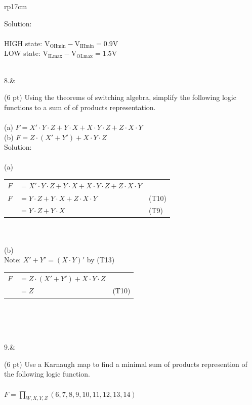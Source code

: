 \documentclass{article}
\begin{document}
\begin{longtable}[l]{rp{17cm}}
\begin{minipage}[t]{\linewidth}
Solution: \\ \\
HIGH state: $\textrm{V}_{\textrm{OHmin}} - \textrm{V}_{\textrm{IHmin}} = 0.9 \textrm{V}$\\
LOW state: $\textrm{V}_{\textrm{ILmax}} - \textrm{V}_{\textrm{OLmax}} = 1.5 \textrm{V}$\\
\end{minipage}\\
\medskip
8.&\begin{minipage}[t]{\linewidth}(6 pt) Using the theorems of switching algebra, simplify the following logic functions to a sum of of products representation.\\ \\
(a) $F=X' \cdot Y \cdot Z + Y \cdot X + X \cdot Y \cdot Z + Z \cdot X \cdot Y$ \\
(b) $F=Z \cdot (X' + Y') + X \cdot Y \cdot Z$ \\

Solution: \\ \\
(a)\\
\begin{tabular}{rll}
  $F$ & $=X' \cdot Y \cdot Z + Y \cdot X + X \cdot Y \cdot Z + Z \cdot X \cdot Y$ &\\
  $F$ & $=Y \cdot Z + Y \cdot X + Z \cdot X \cdot Y$ & (T10)\\
      & $=Y \cdot Z + Y \cdot X$ & (T9)\\
\end{tabular}\\ \\
(b)\\
Note: $X' + Y' = (X \cdot Y)'$ by (T13)\\
\begin{tabular}{rll}
  $F$ & $=Z \cdot (X' + Y') + X \cdot Y \cdot Z$ &\\
      & $=Z$ & (T10)\\
\end{tabular}\\ \\
\end{minipage}\\
\medskip
9.&\begin{minipage}[t]{\linewidth}(6 pt) Use a Karnaugh map to find a minimal sum of products represention of the following logic function.\\ \\
$F=\prod_{W,X,Y,Z}(6,7,8,9,10,11,12,13,14)$\\


\end{minipage}
\end{longtable}
\end{document}
